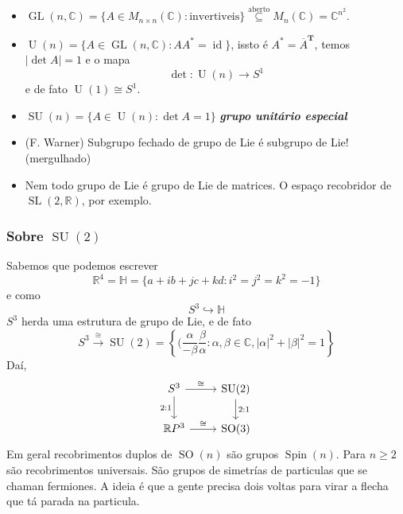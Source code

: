 \begin{example}
\begin{itemize}
\begin{itemize}
	\item $\operatorname{GL}(n,\mathbb{C})=\{A\in M_{n\times n}(\mathbb{C}):\text{invertiveis} \} \overset{\text{aberto} }{\subseteq}M_n(\mathbb{C})=\mathbb{C}^{n^2}$.

	\item $\operatorname{U}(n) =\{A\in\operatorname{GL}(n,\mathbb{C}):A A^*=\operatorname{id}\}$, issto \'e $A^*=\overline{A}^{\mathbf{T}}$, temos $|\det A| =1$ e o mapa
		\[\det :\operatorname{U}(n)\to S^1\]
		e de fato $\operatorname{U}(1) \cong S^1$.

	\item $\operatorname{SU}(n) = \{A\in\operatorname{U}(n) :\det A=1\}$ \textit{\textbf{grupo unit\'ario especial}}
		
		\end{itemize}
	\end{itemize}	
\end{example}

\begin{remark}\leavevmode 
	\begin{itemize}
	\item 	\begin{thm}[de Cartan]\leavevmode
		(F. Warner) Subgrupo fechado de grupo de Lie \'e subgrupo de Lie! (mergulhado)
	\end{thm}

	\item Nem todo grupo de Lie \'e grupo de Lie de matrices. O espaço recobridor de $\operatorname{SL}(2,\mathbb{R})$, por exemplo.
	\end{itemize}
\end{remark}

\subsubsection{Sobre $\operatorname{SU}(2)$}

Sabemos que podemos escrever 
\[\mathbb{R}^{4}=\mathbb{H}=\{a+ib+jc+kd:i^2=j^2=k^2=-1\} \]
e como
\[S^3\hookrightarrow \mathbb{H}\]
$S^3$ herda uma estrutura de grupo de Lie, e de fato
\[S^3\overset{\cong }{\longrightarrow}\operatorname{SU}(2) = \left\{ (\frac{\alpha}{-\beta}\frac{\beta}{\alpha}:\alpha,\beta\in\mathbb{C},|\alpha|^2+|\beta|^2=1\right\} \]
Da\'i,
\[\begin{tikzcd}
	S^3\arrow[r,"\cong "]\arrow[d,"2:1",swap]&\operatorname{SU}(2)\arrow[d,"2:1"]\\
	\mathbb{R}P^{3}\arrow[r,"\cong "]&\operatorname{SO}(3)
\end{tikzcd}\]
Em geral recobrimentos duplos de $\operatorname{SO}(n)$ s\~ao grupos $\operatorname{Spin}(n)$. Para $n\geq 2$ s\~ao recobrimentos universais. S\~ao grupos de simetr\'ias de particulas que se chaman fermiones. A ideia \'e que a gente precisa dois voltas para virar a flecha que t\'a parada na particula.

